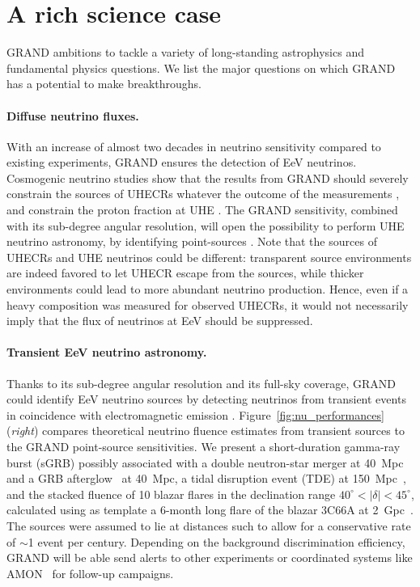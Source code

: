 \documentclass[a4paper,11pt]{article}
\begin{document}
\section{A rich science case}

GRAND ambitions to tackle a variety of long-standing astrophysics and fundamental physics questions. We list the major questions on which GRAND has a potential to make breakthroughs. 

\paragraph{Diffuse neutrino fluxes.} With an increase of almost two decades in neutrino sensitivity compared to existing experiments, GRAND ensures the detection of EeV neutrinos. Cosmogenic neutrino studies show that the results from GRAND should severely constrain the sources of UHECRs whatever the outcome of the measurements \cite{AlvesBatista:2018zui,Moller2019}, and constrain the proton fraction at UHE \cite{van_Vliet_2019}. The GRAND sensitivity, combined with its sub-degree angular resolution, will open the possibility to perform UHE neutrino astronomy, by identifying point-sources \cite{Fang:2016hop}. Note that the sources of UHECRs and UHE neutrinos could be different: transparent source environments are indeed favored to let UHECR escape from the sources, while thicker environments could lead to more abundant neutrino production. Hence, even if a heavy composition was measured for observed UHECRs, it would not necessarily imply that the flux of neutrinos at EeV should be suppressed. 


\paragraph{Transient EeV neutrino astronomy.} Thanks to its sub-degree angular resolution and its full-sky coverage, GRAND could identify EeV neutrino sources by detecting neutrinos from transient events in coincidence with electromagnetic emission \cite{Guepin:2017dfi, 2020PhRvD.102l3013V}. Figure~\ref{fig:nu_performances} ({\it right}) compares theoretical neutrino fluence estimates from transient sources to the GRAND point-source sensitivities. We present a short-duration gamma-ray burst (sGRB) possibly associated with a double neutron-star merger \cite{Kimura_2017} at 40~Mpc and a GRB afterglow\ \cite{Murase:2007yt} at 40~Mpc, a tidal disruption event (TDE) at 150~Mpc\ \cite{Guepin:2017abw}, and the stacked fluence of 10 blazar flares in the declination range $40^\circ< |\delta| < 45^\circ$, calculated using as template a 6-month long flare of the blazar 3C66A at 2~Gpc\ \cite{Murase:2014foa}.
The sources were assumed to lie at distances such to allow for a conservative rate of $\sim$1 event per century.%
Depending on the background discrimination efficiency, GRAND will be able send alerts to other experiments or coordinated systems like AMON~\cite{SOLARES2019} for follow-up campaigns.
\end{document}
